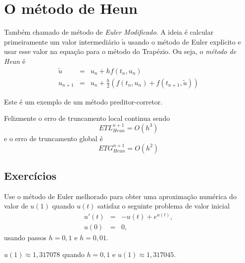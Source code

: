 \section{O método de Heun}
Também chamado de método de \emph{Euler Modificado}. A ideia é calcular primeiramente um valor intermediário $\tilde{u}$ usando o método de Euler expl\'icito e usar esse valor na equação para o método do Trapézio. Ou seja, o \emph{método de Heun} é
\begin{eqnarray}
  \tilde{u} &=& u_n +   h f(t_n,u_n) \\
  u_{n+1}   &=& u_n +  \frac{h}{2} \left(f(t_n,u_n)+f(t_{n+1},\tilde{u})\right)
\end{eqnarray}

Este é um exemplo de um método preditor-corretor.

Felizmente o erro de truncamento local continua sendo
$$ETL_{Heun}^{n+1}= O(h^3)$$
e o erro de truncamento global é
$$ETG_{Heun}^{n+1}= O(h^2)$$















\subsection*{Exercícios}

\begin{exer} Use o método de Euler melhorado para obter uma aproximação numérica do valor de $u(1)$ quando $u(t)$ satisfaz o seguinte problema de valor inicial
\begin{eqnarray*}
 u'(t)&=&-u(t)+ e^{u(t)},\\
 u(0)&=&0,
\end{eqnarray*}
usando passos $h=0,1$ e $h=0,01$.
\end{exer}
\begin{resp}

 $u(1)\approx 1,317078$ quando $h=0,1$ e $u(1)\approx 1,317045$.

\end{resp}


